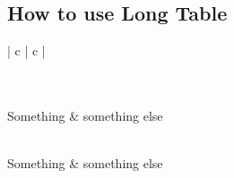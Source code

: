 \documentclass{report}
\begin{document}
\subsection{How to use Long Table}
\begin{longtable}[c]{| c | c |}
\caption{Long table caption.\label{long}}\\
 \hline
 \\
 \hline
 Something & something else\\
 \hline
 \endfirsthead
 
 \hline
 \\
 \hline
 Something & something else\\
 \hline
 \endhead
 
 \hline
 \endfoot
 
 \hline
 \\
 \hline\hline
 \endlastfoot
 

\end{longtable}
\end{document}
